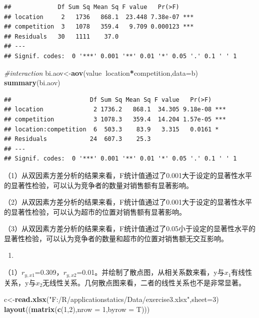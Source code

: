 \documentclass[]{article}
\newenvironment{Shaded}{\begin{snugshade}}{\end{snugshade}}
\newcommand{\KeywordTok}[1]{\textcolor[rgb]{0.13,0.29,0.53}{\textbf{#1}}}
\newcommand{\DataTypeTok}[1]{\textcolor[rgb]{0.13,0.29,0.53}{#1}}
\newcommand{\DecValTok}[1]{\textcolor[rgb]{0.00,0.00,0.81}{#1}}
\newcommand{\StringTok}[1]{\textcolor[rgb]{0.31,0.60,0.02}{#1}}
\newcommand{\CommentTok}[1]{\textcolor[rgb]{0.56,0.35,0.01}{\textit{#1}}}
\newcommand{\OperatorTok}[1]{\textcolor[rgb]{0.81,0.36,0.00}{\textbf{#1}}}
\newcommand{\NormalTok}[1]{#1}
\begin{document}
\begin{verbatim}
##             Df Sum Sq Mean Sq F value   Pr(>F)    
## location     2   1736   868.1  23.448 7.38e-07 ***
## competition  3   1078   359.4   9.709 0.000123 ***
## Residuals   30   1111    37.0                     
## ---
## Signif. codes:  0 '***' 0.001 '**' 0.01 '*' 0.05 '.' 0.1 ' ' 1
\end{verbatim}

\begin{Shaded}
\begin{Highlighting}[]
\CommentTok{#interaction}
\NormalTok{bi.aov<-}\KeywordTok{aov}\NormalTok{(value}\OperatorTok{~}\NormalTok{location}\OperatorTok{*}\NormalTok{competition,}\DataTypeTok{data=}\NormalTok{b)}
\KeywordTok{summary}\NormalTok{(bi.aov)}
\end{Highlighting}
\end{Shaded}

\begin{verbatim}
##                      Df Sum Sq Mean Sq F value   Pr(>F)    
## location              2 1736.2   868.1  34.305 9.18e-08 ***
## competition           3 1078.3   359.4  14.204 1.57e-05 ***
## location:competition  6  503.3    83.9   3.315   0.0161 *  
## Residuals            24  607.3    25.3                     
## ---
## Signif. codes:  0 '***' 0.001 '**' 0.01 '*' 0.05 '.' 0.1 ' ' 1
\end{verbatim}

（1）从双因素方差分析的结果来看，F统计值通过了0.001大于设定的显著性水平的显著性检验，可以认为竞争者的数量对销售额有显著影响。

（2）从双因素方差分析的结果来看，F统计值通过了0.001大于设定的显著性水平的显著性检验，可以认为超市的位置对销售额有显著影响。

（3）从双因素方差分析的结果来看，F统计值通过了0.05小于设定的显著性水平的显著性检验，可以认为竞争者的数量和超市的位置对销售额无交互影响。

\begin{enumerate}
\def\labelenumi{\arabic{enumi}.}
\setcounter{enumi}{2}
\item
\end{enumerate}

（1）\(r_{y,x1}\)=0.309，\(r_{y,x2}\)=0.01。并绘制了散点图，从相关系数来看，y与\(x_1\)有线性关系，y与\(x_2\)无线性关系。几何散点图来看，二者的线性关系也不是非常显著。

\begin{Shaded}
\begin{Highlighting}[]
\NormalTok{c<-}\KeywordTok{read.xlsx}\NormalTok{(}\StringTok{"F:/R/applicationstatics/Data/exercise3.xlsx"}\NormalTok{,}\DataTypeTok{sheet=}\DecValTok{3}\NormalTok{)}
\KeywordTok{layout}\NormalTok{((}\KeywordTok{matrix}\NormalTok{(}\KeywordTok{c}\NormalTok{(}\DecValTok{1}\NormalTok{,}\DecValTok{2}\NormalTok{),}\DataTypeTok{nrow =} \DecValTok{1}\NormalTok{,}\DataTypeTok{byrow =}\NormalTok{ T)))}
\end{Highlighting}
\end{Shaded}
\end{document}
